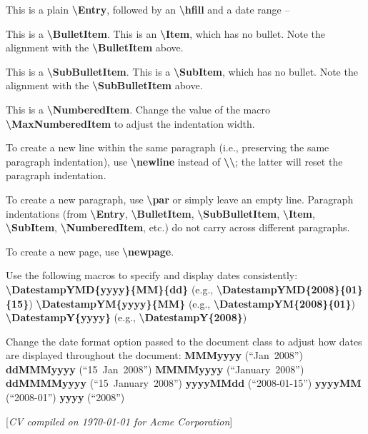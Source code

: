 \documentclass[letterpaper,MMMyyyy,nonstopmode]{./simple-resume-cv-master/simpleresumecv}
\newcommand{\CVNote}{CV compiled on {\today} for Acme Corporation}
\newcommand{\Code}[1]{\mbox{\textbf{#1}}}
\newcommand{\CodeCommand}[1]{\mbox{\textbf{\textbackslash{#1}}}}
\begin{document}
\begin{Body}
	\Gap
	\Entry
		This is a plain \CodeCommand{Entry},
		followed by an \CodeCommand{hfill} and a date range
		\hfill
		 --

	\Gap
	\BulletItem
		This is a \CodeCommand{BulletItem}.
	\Item
		This is an \CodeCommand{Item}, which has no bullet.
		Note the alignment with the \CodeCommand{BulletItem} above.

	\Gap
	\SubBulletItem
		This is a \CodeCommand{SubBulletItem}.
	\SubItem
		This is a \CodeCommand{SubItem}, which has no bullet.
		Note the alignment with the \CodeCommand{SubBulletItem} above.

	\Gap
	\NumberedItem{[42]}
		This is a \CodeCommand{NumberedItem}.
		Change the value of the macro \CodeCommand{MaxNumberedItem} to adjust the indentation width.
	\BigGap

	\Gap
	\BulletItem
	To create a new line within the same paragraph (i.e., preserving the same paragraph indentation), use \CodeCommand{newline} instead of \CodeCommand{\textbackslash};
	the latter will reset the paragraph indentation.

	\Gap
	\BulletItem
		To create a new paragraph, use \CodeCommand{par} or simply leave an empty line.
		Paragraph indentations (from
		\CodeCommand{Entry},
		\CodeCommand{BulletItem},
		\CodeCommand{SubBulletItem},
		\CodeCommand{Item},
		\CodeCommand{SubItem},
		\CodeCommand{NumberedItem},
		etc.) do not carry across different paragraphs.

	\Gap
	\BulletItem
		To create a new page, use \CodeCommand{newpage}.

	\BigGap

	\Gap
	\BulletItem
		Use the following macros to specify and display dates consistently:
		\SubBulletItem
		\CodeCommand{DatestampYMD\{yyyy\}\{MM\}\{dd\}}
		(e.g., \CodeCommand{DatestampYMD\{2008\}\{01\}\{15\}})
		\SubBulletItem
		\CodeCommand{DatestampYM\{yyyy\}\{MM\}}
		(e.g., \CodeCommand{DatestampYM\{2008\}\{01\}})
		\SubBulletItem
		\CodeCommand{DatestampY\{yyyy\}}
		(e.g., \CodeCommand{DatestampY\{2008\}})

	\Gap
	\BulletItem
		Change the date format option passed to the document class to adjust how dates are displayed throughout the document:
		\SubBulletItem
			\Code{MMMyyyy} (``Jan~2008'')
		\SubBulletItem
			\Code{ddMMMyyyy} (``15~Jan~2008'')
		\SubBulletItem
			\Code{MMMMyyyy} (``January~2008'')
		\SubBulletItem
			\Code{ddMMMMyyyy} (``15~January~2008'')
		\SubBulletItem
			\Code{yyyyMMdd} (``2008-01-15'')
		\SubBulletItem
			\Code{yyyyMM} (``2008-01'')
		\SubBulletItem
			\Code{yyyy} (``2008'')
\endgroup
\end{Body}

\UseNoteFont%
\null\hfill%
[\textit{\CVNote}]
\end{document}
